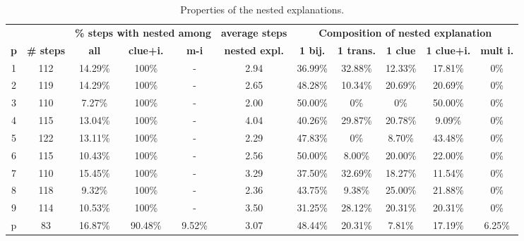 

\begin{table}[t]
	\centering
	\begin{tabular}{c|c|ccc|c|ccccc}
		& &  \multicolumn{3}{c|}{\textbf{\% steps with nested among}} & \multicolumn{1}{c|}{\textbf{average steps}} & \multicolumn{5}{c}{\textbf{Composition of nested explanation }}\\
		\textbf{p} & \textbf{\# steps } & \textbf{all}     & \textbf{clue+i.} & \textbf{m-i}          & \textbf{nested expl.} & \textbf{1 bij.} & \textbf{1 trans.} & \textbf{1 clue} & \textbf{1 clue+i.} & \textbf{mult i.} \\ \hline
		1 &      112 &  14.29\% &  100\% &  - &         2.94 &  36.99\% &   32.88\% &  12.33\% &    17.81\% &    0\% \\
		2 &      119 &  14.29\% &  100\% &  - &         2.65 &  48.28\% &   10.34\% &  20.69\% &    20.69\% &    0\% \\
		3 &      110 &   7.27\% &  100\% &  - &         2.00 &  50.00\% &    0\% &   0\% &    50.00\% &    0\% \\
		4 &      115 &  13.04\% &  100\% &  - &         4.04 &  40.26\% &   29.87\% &  20.78\% &     9.09\% &    0\% \\
		5 &      122 &  13.11\% &  100\% &  - &         2.29 &  47.83\% &    0\% &   8.70\% &    43.48\% &    0\% \\
		6 &      115 &  10.43\% &  100\% &  - &         2.56 &  50.00\% &    8.00\% &  20.00\% &    22.00\% &    0\% \\
		7 &      110 &  15.45\% &  100\% &  - &         3.29 &  37.50\% &   32.69\% &  18.27\% &    11.54\% &    0\% \\
		8 &      118 &   9.32\% &  100\% &  - &         2.36 &  43.75\% &    9.38\% &  25.00\% &    21.88\% &    0\% \\
		9 &      114 &  10.53\% &  100\% &  - &         3.50 &  31.25\% &   28.12\% &  20.31\% &    20.31\% &    0\% \\
		p &       83 &  16.87\% &   90.48\% &  9.52\% &         3.07 &  48.44\% &   20.31\% &   7.81\% &    17.19\% &    6.25\% \\
	\end{tabular}
	\caption{Properties of the nested explanations. }
	\label{table:nested_explanation}
\end{table}

